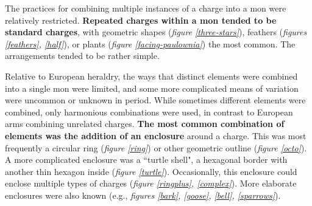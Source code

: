 \documentclass{article}
\begin{document}
  \begin{figure}
  \begin{subfigs}
  \end{subfigs}
  \end{figure}



  The practices for combining multiple instances of a charge into a
  mon were relatively restricted.  \textbf{Repeated charges within a mon tended to be
  standard charges}, with geometric shapes (\emph{figure \ref{three-stars}}), feathers (\emph{figures \ref{feathers}, \ref{half}}), or plants (\emph{figure \ref{facing-paulownia}}) the most
  common. The arrangements tended to be rather
  simple.

  \clearpage

  \begin{figure}
  \begin{subfigs}
  \end{subfigs}
  \end{figure}

  Relative to European heraldry, the ways that distinct elements were
  combined into a single mon were limited, and some more complicated
  means of variation were uncommon or unknown in period.
  While sometimes different elements were combined, only harmonious
  combinations were used, in contrast to European arms combining
  unrelated charges. \textbf{The most common combination
  of elements was the addition of an enclosure} around a
  charge.  This was most frequently a
  circular ring (\emph{figure \ref{ring}}) or other geometric 
  outline (\emph{figure \ref{octo}}).  
  A more complicated enclosure was a ``turtle shell", a hexagonal border
  with another thin hexagon inside (\emph{figure \ref{turtle}}).
  Occasionally, this enclosure could enclose
  multiple types of charges (\emph{figure \ref{ringplus}, \ref{complex}}).
  More elaborate enclosures were also known (e.g., \emph{figures
    \ref{bark}, \ref{goose}, \ref{bell}, \ref{sparrows}}).
\end{document}

